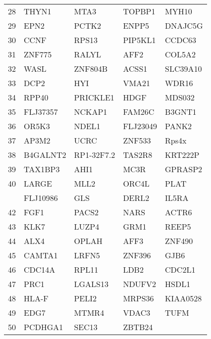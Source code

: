 \begin{longtable}{lllll}
28&THYN1&MTA3&TOPBP1&MYH10\tabularnewline
29&EPN2&PCTK2&ENPP5&DNAJC5G\tabularnewline
30&CCNF&RPS13&PIP5KL1&CCDC63\tabularnewline
31&ZNF775&RALYL&AFF2&COL5A2\tabularnewline
32&WASL&ZNF804B&ACSS1&SLC39A10\tabularnewline
33&DCP2&HYI&VMA21&WDR16\tabularnewline
34&RPP40&PRICKLE1&HDGF&MDS032\tabularnewline
35&FLJ37357&NCKAP1&FAM26C&B3GNT1\tabularnewline
36&OR5K3&NDEL1&FLJ23049&PANK2\tabularnewline
37&AP3M2&UCRC&ZNF533&Rps4x\tabularnewline
38&B4GALNT2&RP1-32F7.2&TAS2R8&KRT222P\tabularnewline
39&TAX1BP3&AHI1&MC3R&GPRASP2\tabularnewline
40&LARGE&MLL2&ORC4L&PLAT\tabularnewline
\newpage
41&FLJ10986&GLS&DERL2&IL5RA\tabularnewline
42&FGF1&PACS2&NARS&ACTR6\tabularnewline
43&KLK7&LUZP4&GRM1&REEP5\tabularnewline
44&ALX4&OPLAH&AFF3&ZNF490\tabularnewline
45&CAMTA1&LRFN5&ZNF396&GJB6\tabularnewline
46&CDC14A&RPL11&LDB2&CDC2L1\tabularnewline
47&PRC1&LGALS13&NDUFV2&HSDL1\tabularnewline
48&HLA-F&PELI2&MRPS36&KIAA0528\tabularnewline
49&EDG7&MTMR4&VDAC3&TUFM\tabularnewline
50&PCDHGA1&SEC13&ZBTB24&\tabularnewline
\bottomrule
\end{longtable}
